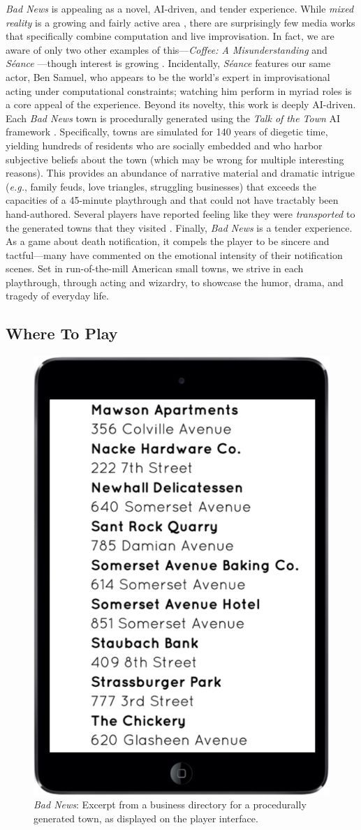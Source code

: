 \documentclass[letterpaper]{article}
\begin{document}
\textit{Bad News} is appealing as a novel, AI-driven, and tender experience.
While \textit{mixed reality} is a growing and fairly active area \cite{ohta2014mixed}, there are surprisingly few media works that specifically combine computation and live improvisation.
In fact, we are aware of only two other examples of this---\textit{Coffee: A Misunderstanding} \cite{squinkifer2014coffee} and \textit{S\'{e}ance} \cite{seance}---though interest is growing \cite{martens2016towards}.
Incidentally, \textit{S\'{e}ance} features our same actor, Ben Samuel, who appears to be the world's expert in improvisational acting under computational constraints; watching him perform in myriad roles is a core appeal of the experience.
Beyond its novelty, this work is deeply AI-driven.
Each \textit{Bad News} town is procedurally generated using the \textit{Talk of the Town} AI framework \cite{ryan2015toward}.
Specifically, towns are simulated for 140 years of diegetic time, yielding hundreds of residents who are socially embedded and who harbor subjective beliefs about the town (which may be wrong for multiple interesting reasons).
This provides an abundance of narrative material and dramatic intrigue (\textit{e.g.}, family feuds, love triangles, struggling businesses) that exceeds the capacities of a 45-minute playthrough and that could not have tractably been hand-authored.
Several players have reported feeling like they were \textit{transported} to the generated towns that they visited \cite{green2004understanding}.
Finally, \textit{Bad News} is a tender experience.
As a game about death notification, it compels the player to be sincere and tactful---many have commented on the emotional intensity of their notification scenes.
Set in run-of-the-mill American small towns, we strive in each playthrough, through acting and wizardry, to showcase the humor, drama, and tragedy of everyday life.

\subsection{Where To Play}

\begin{figure}[t]
  \centering
  \includegraphics[width=0.42\columnwidth]{images/bad_news-player_interface}
  \caption{\textit{Bad News}: Excerpt from a business directory for a procedurally generated town, as displayed on the player interface.}
  \label{fig:bn-player_interface}
\end{figure}
\end{document}
